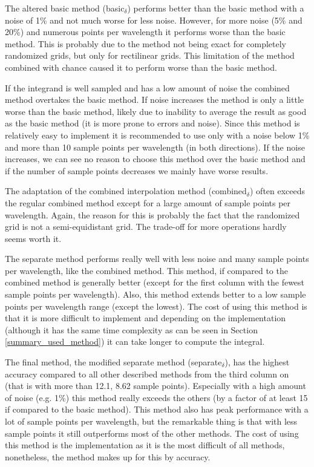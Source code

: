 The altered basic method (basic$_\delta$) performs better than the basic method with a noise of 1\% and not much worse for less noise.
However, for more noise (5\% and 20\%) and numerous points per wavelength it performs worse than the basic method.
This is probably due to the method not being exact for completely randomized grids, but only for rectilinear grids.
This limitation of the method combined with chance caused it to perform worse than the basic method.

If the integrand is well sampled and has a low amount of noise the combined method overtakes the basic method.
If noise increases the method is only a little worse than the basic method, likely due to inability to average the result as good as the basic method (it is more prone to errors and noise).
Since this method is relatively easy to implement it is recommended to use only with a noise below 1\% and more than 10 sample points per wavelength (in both directions).
If the noise increases, we can see no reason to choose this method over the basic method and if the number of sample points decreases we mainly have worse results.

The adaptation of the combined interpolation method (combined$_\delta$) often exceeds the regular combined method except for a large amount of sample points per wavelength.
Again, the reason for this is probably the fact that the randomized grid is not a semi-equidistant grid.
The trade-off for more operations hardly seems worth it.

The separate method performs really well with less noise and many sample points per wavelength, like the combined method.
This method, if compared to the combined method is generally better (except for the first column with the fewest sample points per wavelength).
Also, this method extends better to a low sample points per wavelength range (except the lowest).
The cost of using this method is that it is more difficult to implement and depending on the implementation (although it has the same time complexity as can be seen in Section \ref{summary_used_method}) it can take longer to compute the integral.

The final method, the modified separate method (separate$_\delta$), has the highest accuracy compared to all other described methods from the third column on (that is with more than 12.1, 8.62 sample points).
Especially with a high amount of noise (e.g. 1\%) this method really exceeds the others (by a factor of at least 15 if compared to the basic method).
This method also has peak performance with a lot of sample points per wavelength, but the remarkable thing is that with less sample points it still outperforms most of the other methods.
The cost of using this method is the implementation as it is the most difficult of all methods, nonetheless, the method makes up for this by accuracy.


